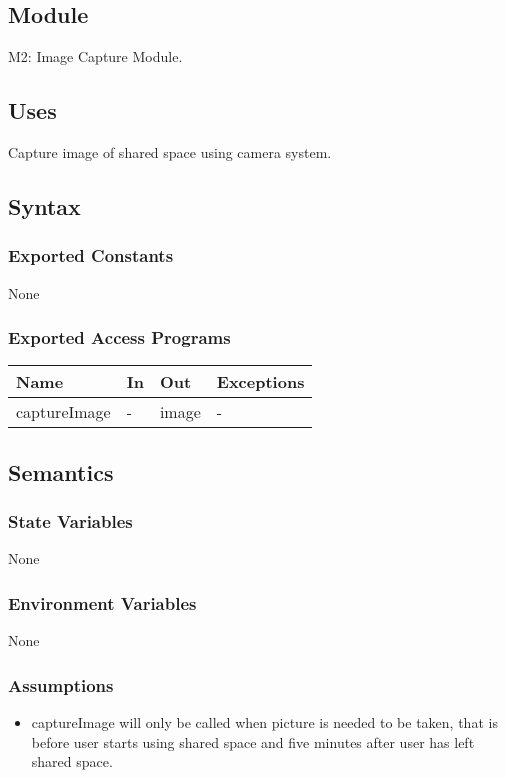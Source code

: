 \documentclass[12pt, titlepage]{article}
\begin{document}
\subsection{Module}

M2: Image Capture Module.

\subsection{Uses}
Capture image of shared space using camera system.

\subsection{Syntax}

\subsubsection{Exported Constants}
None

\subsubsection{Exported Access Programs}

\begin{center}
\begin{tabular}{p{4cm} p{4cm} p{4cm} p{3.5cm}}
\hline
\textbf{Name} & \textbf{In} & \textbf{Out} & \textbf{Exceptions} \\
\hline
captureImage & - & image & - \\
\hline
\end{tabular}
\end{center}

\subsection{Semantics}

\subsubsection{State Variables}
None

\subsubsection{Environment Variables}
None

\subsubsection{Assumptions}
\begin{itemize}
\item captureImage will only be called when picture is needed to be taken, that is before user starts using shared space and five minutes after user has left shared space.
\end{itemize}
\end{document}
